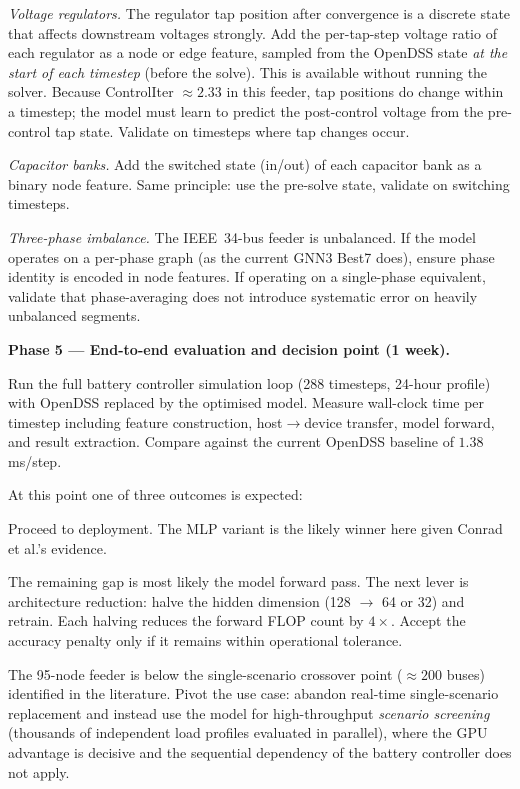 \documentclass[11pt]{article}
\begin{document}
\emph{Voltage regulators.}  The regulator tap position after convergence
is a discrete state that affects downstream voltages strongly.  Add the
per-tap-step voltage ratio of each regulator as a node or edge feature,
sampled from the OpenDSS state \emph{at the start of each timestep}
(before the solve).  This is available without running the solver.
Because ControlIter $\approx 2.33$ in this feeder, tap positions do
change within a timestep; the model must learn to predict the post-control
voltage from the pre-control tap state.  Validate on timesteps where
tap changes occur.

\emph{Capacitor banks.}  Add the switched state (in/out) of each
capacitor bank as a binary node feature.  Same principle: use the
pre-solve state, validate on switching timesteps.

\emph{Three-phase imbalance.}  The IEEE~34-bus feeder is unbalanced.
If the model operates on a per-phase graph (as the current GNN3 Best7
does), ensure phase identity is encoded in node features.  If operating
on a single-phase equivalent, validate that phase-averaging does not
introduce systematic error on heavily unbalanced segments.

\medskip
\noindent\textbf{Phase 5 --- End-to-end evaluation and decision point (1 week).}

Run the full battery controller simulation loop (288 timesteps, 24-hour
profile) with OpenDSS replaced by the optimised model.  Measure
wall-clock time per timestep including feature construction, host$\to$device
transfer, model forward, and result extraction.  Compare against
the current OpenDSS baseline of $1.38$\,ms/step.

At this point one of three outcomes is expected:

\begin{description}[itemsep=3pt]
  \item[\textbf{Success (model faster, accuracy acceptable).}]
    Proceed to deployment.  The MLP variant is the likely winner here
    given Conrad et al.'s evidence.

  \item[\textbf{Close but not faster.}]
    The remaining gap is most likely the model forward pass.  The next
    lever is architecture reduction: halve the hidden dimension (128
    $\to$ 64 or 32) and retrain.  Each halving reduces the forward
    FLOP count by $4\times$.  Accept the accuracy penalty only if
    it remains within operational tolerance.

  \item[\textbf{Still substantially slower.}]
    The 95-node feeder is below the single-scenario crossover point
    (${\approx}200$ buses) identified in the literature.  Pivot the
    use case: abandon real-time single-scenario replacement and instead
    use the model for high-throughput \emph{scenario screening}
    (thousands of independent load profiles evaluated in parallel),
    where the GPU advantage is decisive and the sequential dependency
    of the battery controller does not apply.
\end{description}
\end{document}
